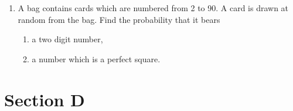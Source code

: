 \documentclass[journal,12pt,twocolumn]{IEEEtran}
\renewcommand\thesection{\arabic{section}}
\begin{document}
\begin{enumerate}[label=\thesection.\arabic*.,ref=\thesection.\theenumi]
\begin{enumerate}
\begin{figure}[h!]
	\caption{}
	\label{fig5}
 \end{figure}
\end{enumerate}
\item A bag contains cards which are numbered from 2 to 90. A card is drawn at random from the bag. Find the probability that it bears \\
\begin{enumerate}
\item a two digit number,
\item a number which is a perfect square. 
\end{enumerate}
\end{enumerate}
\section{Section D}
\renewcommand{\theequation}{\theenumi}
\end{document}
